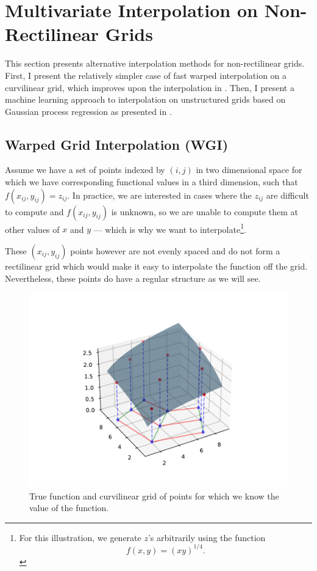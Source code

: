 \documentclass[\econtexRoot/SequentialEGM]{subfiles}
\begin{document}
\hypertarget{machine-learning}{}
\par\section{Multivariate Interpolation on Non-Rectilinear Grids}
\notinsubfile{\label{sec:gpr}}

This section presents alternative interpolation methods for non-rectilinear grids. First, I present the relatively simpler case of fast warped interpolation on a curvilinear grid, which improves upon the interpolation in \cite{White2015-fg}. Then, I present a machine learning approach to interpolation on unstructured grids based on Gaussian process regression as presented in \cite{Scheidegger2019-xf}.

\subsection{Warped Grid Interpolation (WGI)}

Assume we have a set of points indexed by $(i,j)$ in two dimensional space for which we have corresponding functional values in a third dimension, such that $f(x_{ij},y_{ij}) = z_{ij}$. In practice, we are interested in cases where the $z_{ij}$ are difficult to compute and $f(x_{ij},y_{ij})$ is unknown, so we are unable to compute them at other values of $x$ and $y$ --- which is why we want to interpolate\footnote{For this illustration, we generate $z$'s arbitrarily using the function $$f(x,y) = (xy)^{1/4}.$$}.

These $(x_{ij},y_{ij})$ points however are not evenly spaced and do not form a rectilinear grid which would make it easy to interpolate the function off the grid. Nevertheless, these points do have a regular structure as we will see.

\begin{figure}
    \centering
    \includegraphics[width=0.8\linewidth]{Figures/WarpedInterpolation.pdf}
    \caption{True function and curvilinear grid of points for which we know the value of the function.}
    \notinsubfile{\label{fig:warped_interp}}
\end{figure}
\end{document}
